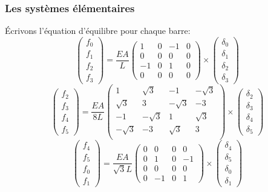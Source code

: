 \documentclass{beamer}
\begin{document}
\begin{frame}
\frametitle{Les systèmes élémentaires}
Écrivons l'équation d'équilibre pour chaque barre:
\[ \left(\begin{array}{r}f_0\\ f_1\\f_2\\f_3 \end{array}\right) 
 =\frac{EA}{L}\left(\begin{array}{rrrr} 
1&0&-1&0\\
0&0&0&0\\
-1&0&1&0\\
0&0&0&0
\end{array}\right)\times
\left(\begin{array}{r} \delta_0\\\delta_1\\\delta_2\\\delta_3 \end{array}\right) 
\]
\[
\left(\begin{array}{r}f_2\\ f_3\\f_4\\f_5 \end{array}\right) 
=\frac{EA}{8L}\left(\begin{array}{rrrr} 
1&\sqrt 3&-1&-\sqrt 3\\
\sqrt 3&3&-\sqrt 3&-3\\
-1&-\sqrt 3&1&\sqrt 3\\
-\sqrt 3&-3&\sqrt 3&3\\
\end{array}\right)\times
\left(\begin{array}{r} \delta_2\\ \delta_3\\\delta_4\\\delta_5 \end{array}\right) 
\]
\[\left(\begin{array}{r}f_4\\ f_5\\f_0\\f_1 \end{array}\right) 
=\frac{EA}{\sqrt 3L}\left(\begin{array}{rrrr} 
0&0&0&0\\
0&1&0&-1\\
0&0&0&0\\
0&-1&0&1
\end{array}\right)\times
\left(\begin{array}{r} \delta_4\\ \delta_5\\\delta_0\\\delta_1  \end{array}\right) 
\]
\end{frame}
\end{document}
